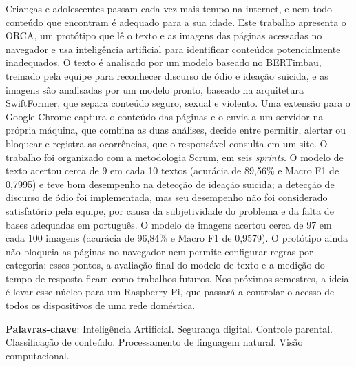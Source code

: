 \documentclass[
    12pt,           %
    oneside,        %
    a4paper,        %
    chapter=TITLE,  %
    english,        %
    brazil          %
]{abntex2}
\begin{document}
\begin{resumo}
    \SingleSpacing

    Crianças e adolescentes passam cada vez mais tempo na internet, e nem
    todo conteúdo que encontram é adequado para a sua idade. Este trabalho
    apresenta o ORCA, um protótipo que lê o texto e as imagens das páginas
    acessadas no navegador e usa inteligência artificial para identificar
    conteúdos potencialmente inadequados. O texto é analisado por um modelo
    baseado no BERTimbau, treinado pela equipe para reconhecer discurso de ódio
    e ideação suicida, e as imagens são analisadas por um modelo pronto,
    baseado na arquitetura SwiftFormer, que separa conteúdo seguro, sexual e
    violento. Uma extensão para o Google Chrome captura o conteúdo das páginas
    e o envia a um servidor na própria máquina, que combina as duas análises,
    decide entre permitir, alertar ou bloquear e registra as ocorrências, que o
    responsável consulta em um site. O trabalho foi organizado com a
    metodologia Scrum, em seis \textit{sprints}. O modelo de texto acertou
    cerca de 9 em cada 10 textos (acurácia de 89,56\% e Macro F1 de 0,7995) e
    teve bom desempenho na detecção de ideação suicida; a detecção de discurso
    de ódio foi implementada, mas seu desempenho não foi considerado
    satisfatório pela equipe, por causa da subjetividade do problema e da falta
    de bases adequadas em português. O modelo de imagens acertou cerca de 97 em
    cada 100 imagens (acurácia de 96,84\% e Macro F1 de 0,9579). O protótipo
    ainda não bloqueia as páginas no navegador nem permite configurar regras
    por categoria; esses pontos, a avaliação final do modelo de texto e a
    medição do tempo de resposta ficam como trabalhos futuros. Nos próximos
    semestres, a ideia é levar esse núcleo para um Raspberry Pi, que passará a
    controlar o acesso de todos os dispositivos de uma rede doméstica.
    \vspace{\onelineskip}
    \noindent

    \textbf{Palavras-chave}: Inteligência Artificial. Segurança digital. Controle parental. Classificação de conteúdo. Processamento de linguagem natural. Visão computacional.
\end{resumo}

\tableofcontents*
\cleardoublepage
\textual
\pagestyle{simple}
\end{document}
